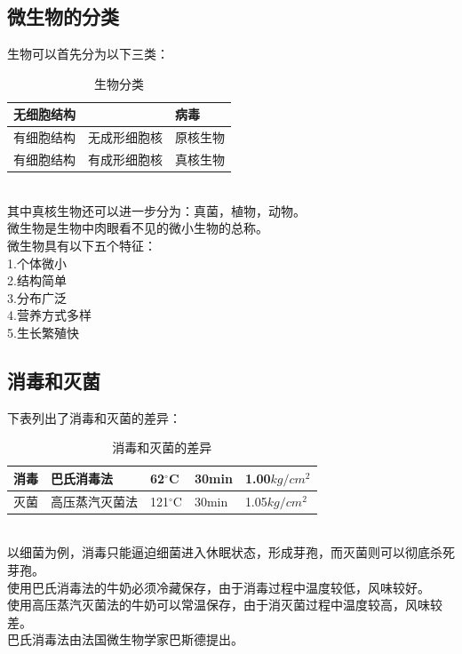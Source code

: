 \documentclass[UTF8]{ctexart}
\begin{document}
\subsection{微生物的分类}
    生物可以首先分为以下三类：
    \vspace{5pt}
    \begin{table}[h]
        \begin{center}
            \begin{tabular}{l|l}
                \hline
                无细胞结构&病毒\\ \hline
                有细胞结构~~无成形细胞核&原核生物\\ \hline
                有细胞结构~~有成形细胞核\qquad\qquad&真核生物\qquad\qquad\\ \hline
            \end{tabular}
            \caption{生物分类}
        \end{center}
    \end{table}\\
    其中真核生物还可以进一步分为：真菌，植物，动物。\\[3mm]
    微生物是生物中肉眼看不见的微小生物的总称。\\[3mm]
    微生物具有以下五个特征：\\[3mm]
    1.个体微小\\[3mm]
    2.结构简单\\[3mm]
    3.分布广泛\\[3mm]
    4.营养方式多样\\[3mm]
    5.生长繁殖快\\

\subsection{消毒和灭菌}
    下表列出了消毒和灭菌的差异：\vspace{5pt}
    \begin{table}[h]
        \begin{center}
            \begin{tabular}{l|l|l|l|l}
                \hline
                消毒\qquad\qquad&巴氏消毒法\qquad\qquad&62$^\circ$C\qquad\qquad&30min\qquad\qquad&1.00$kg/cm^2$\qquad\qquad\\ \hline
                灭菌\qquad\qquad&高压蒸汽灭菌法\qquad\qquad&121$^\circ$C\qquad\qquad&30min\qquad\qquad&1.05$kg/cm^2$\qquad\qquad\\ \hline
            \end{tabular}
            \caption{消毒和灭菌的差异}
        \end{center}
    \end{table}\\
    以细菌为例，消毒只能逼迫细菌进入休眠状态，形成芽孢，而灭菌则可以彻底杀死芽孢。\\[3mm]
    使用巴氏消毒法的牛奶必须冷藏保存，由于消毒过程中温度较低，风味较好。\\[3mm]
    使用高压蒸汽灭菌法的牛奶可以常温保存，由于消灭菌过程中温度较高，风味较差。\\[6mm]
    巴氏消毒法由法国微生物学家巴斯德提出。
\end{document}
